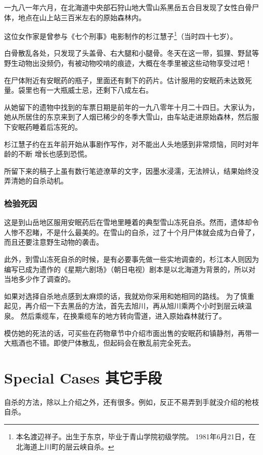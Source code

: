 \documentclass[UTF8]{ctexart}
\begin{document}
一九八一年六月，在北海道中央部石狩山地大雪山系黑岳五合目发现了女性白骨尸体，地点在山上站三百米左右的原始森林内。

这位女作家是曾参与《七个刑事》电影制作的杉江慧子\footnote{本名渡辺祥子。出生于东京，毕业于青山学院初级学院。 1981年6月21日，在北海道上川町的层云峡自杀。}（当时四十七岁）。

白骨散乱各处，只发现了头盖骨、右大腿和小腿骨。冬天在这一带，狐狸、野鼠等野生动物出没频仍，有被动物咬啃的痕迹，大概在冬季里被这些动物享受过吧！

在尸体附近有安眠药的瓶子，里面还有剩下的药片。估计服用的安眠药未达致死量。袋里也有一大瓶威士忌，还剩下八成左右。

从她留下的遗物中找到的车票日期是前年的一九八零年十月二十四日。大家认为，她从所居住的东京来到了人烟已稀少的冬季大雪山，由车站走进原始森林，然后服下安眠药睡着后冻死的。

杉江慧子约在五年前开始从事剧作写作，对不能出人头地感到非常烦恼，同时对年龄的不断 增长也感到恐慌。

所留下来的稿子上虽有数行笔迹潦草的文字，因墨水浸濡，无法辨认，结果始终没弄清她的自杀动机。

\subsubsection*{检验死因}

这是到山岳地区服用安眠药后在雪地里睡着的典型雪山冻死自杀。然而，遗体却令人惨不忍睹，不是什么最美的。在雪山的自杀，过了十个月尸体就会成为白骨了，而且还要注意野生动物的袭击。

此外，到雪山冻死自杀的时候，是有必要事先做一些实地调查的，杉江本人则因为编写已成为遗作的《星期六剧场》（朝日电视）剧本是以北海道为背景的，所以对当地多少作了调查的。

如果对选择自杀地点感到太麻烦的话，我就劝你采用和她相同的路线。
为了慎重起见，再介绍一下去黑岳的方法，首先去旭川，再从旭川乘两个小时到层云峡温泉。
然后乘缆车，在换乘缆车的地方转向雪道，进入原始森林就行了。

模仿她的死法的话，可买些在药物章节中介绍市面出售的安眠药和镇静剂，再带一大瓶酒也不错。即使尸体散乱，但起码会在散乱前完全死去。



\newpage

\section{Special Cases 其它手段}

自杀的方法，除以上介绍之外，还有很多。例如，反正不易弄到手就没介绍的枪枝自杀。
\end{document}
